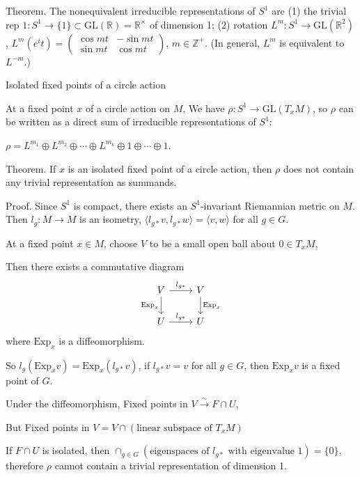 \documentclass{article}
\theoremstyle{mystyle}
\theoremstyle{remark}
\numberwithin{equation}{section}
\begin{document}
Theorem. The nonequivalent irreducible representations of $S^1$ are (1) the trivial rep $1\colon S^1\rightarrow \{1\}\subset \mathrm{GL}(\mathbb{R}) = \mathbb{R}^\times$ of dimension 1;
(2) rotation $L^m\colon S^1\rightarrow \mathrm{GL}(\mathbb{R}^2)$, $L^m(e^it)
=\begin{pmatrix} \cos mt & -\sin mt \\ \sin mt & \cos mt \end{pmatrix}$, $m \in \mathbb{Z}^+$.  (In general, $L^m$ is equivalent to $L^{-m}$.)


Isolated fixed points of a circle action


At a fixed point $x$ of a circle action on $M$, We have $\rho\colon S^1\rightarrow \mathrm{GL}(T_xM)$, so $\rho$ can be written as a direct sum of irreducible representations of $S^1$:

$\rho = L^{m_1}\oplus L^{m_2}\oplus \cdots \oplus L^{m_k}\oplus 1\oplus \cdots \oplus 1$. 

Theorem. If $x$ is an isolated fixed point of a circle action, then $\rho$ does not contain any trivial representation as summands.

Proof. Since $S^1$ is compact, there exists an $S^1$-invariant Riemannian metric on $M$. Then $l_g\colon M\rightarrow M$ is an isometry, $\langle l_{g*}v,l_{g*}w\rangle = \langle v,w\rangle$ for all $g\in G$. 


At a fixed point $x \in M$, choose $V$ to be a small open ball about $0\in T_xM$, 

Then there exists a commutative diagram
$$
\begin{tikzcd} 
V\ar[r,"l_{g*}"] \ar[d,"\mathrm{Exp}_x"'] & V \ar[d, "\mathrm{Exp}_x"] \\
U \ar[r,"l_{g*}"] & U 
\end{tikzcd}
$$
where $\mathrm{Exp}_x$ is a diffeomorphism.

So $l_g(\mathrm{Exp}_xv) = \mathrm{Exp}_x(l_{g*}v)$, if $l_{g*}v = v$ for all $g\in G$, then $\mathrm{Exp}_xv$ is a fixed point of $G$.

Under the diffeomorphism, Fixed points in $V \xrightarrow{\sim} F\cap U$, 

But Fixed points in $V=V\cap (\text{linear subspace of }T_xM)$

If $F\cap U$ is isolated, then $\cap_{g \in G} (\text{eigenspaces of }l_{g*}\text{ with eigenvalue }1) = \{0\}$, therefore $\rho$ cannot contain a trivial representation of dimension 1.
\end{document}
